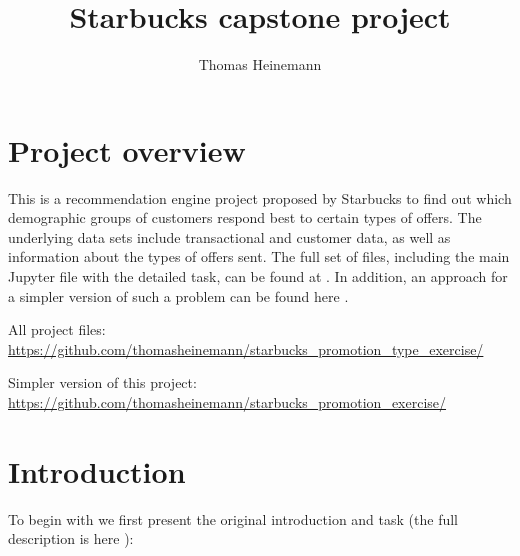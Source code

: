 \documentclass[11pt]{article} %
\title{Starbucks capstone project}
\author{Thomas Heinemann}
\begin{document}
\maketitle

\section{Project overview}

This is a recommendation engine project proposed by Starbucks to find out which demographic groups of customers respond best to certain types of offers. The underlying data sets include transactional and customer data, as well as information about the types of offers sent. The full set
of files, including the main Jupyter file with the detailed task, can be found at \cite{a}.
In addition, an approach for a simpler version of such a problem can be found here \cite{b}.


\begin{thebibliography}{2}

 All project files: {\scriptsize \url{https://github.com/thomasheinemann/starbucks_promotion_type_exercise/}}

 Simpler version of this project: {\scriptsize\url{https://github.com/thomasheinemann/starbucks_promotion_exercise/}}



\end{thebibliography}

\section{Introduction}
To begin with we first present the original introduction and task (the full description is here \cite{a}):
\end{document}

